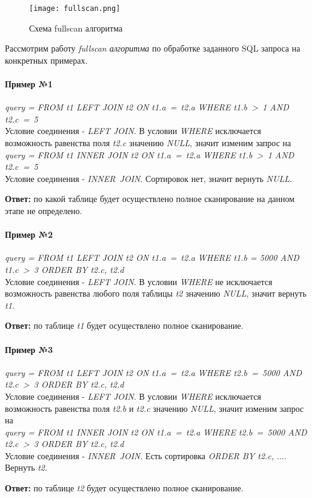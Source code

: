 \begin{figure}[h]
  \centering
  \texttt{[image: fullscan.png]}
  \caption{Схема fullscan алгоритма}
  \label{img:fullscan}
\end{figure}


Рассмотрим работу \textit{fullscan алгоритма} по обработке заданного SQL запроса на конкретных  примерах.

\paragraph{Пример №1}

\textit{query = FROM t1 LEFT JOIN t2 ON t1.a~=~t2.a WHERE t1.b~>~1 AND t2.c~=~5}\\
Условие соединения - \textit{LEFT JOIN}. В условии \textit{WHERE} исключается возможность равенства поля \textit{t2.c} значению \textit{NULL}, значит изменим запрос на\\
\textit{query = FROM t1 INNER JOIN t2 ON t1.a~=~t2.a WHERE t1.b~>~1 AND t2.c~=~5}\\
Условие соединения - \textit{INNER JOIN}. Сортировок нет, значит вернуть \textit{NULL}. 

\textbf{Ответ:} по какой таблице будет осуществлено полное сканирование на данном этапе не определено.


\paragraph{Пример №2}

\textit{query = FROM t1 LEFT JOIN t2  ON t1.a~=~t2.a WHERE t1.b = 5000 AND t1.c~>~3 ORDER BY t2.c, t2.d}\\
Условие соединения - \textit{LEFT JOIN}. В условии \textit{WHERE} не исключается возможность равенства любого поля таблицы \textit{t2} значению \textit{NULL}, значит вернуть \textit{t1}.

\textbf{Ответ:} по таблице \textit{t1} будет осуществлено полное сканирование. 


\paragraph{Пример №3}

\textit{query = FROM t1 LEFT JOIN t2 ON t1.a~=~t2.a WHERE t2.b~=~5000 AND t2.c~>~3 ORDER BY t2.c, t2.d}\\
Условие соединения - \textit{LEFT JOIN}. В условии \textit{WHERE} исключается возможность равенства поля \textit{t2.b} и \textit{t2.c} значению \textit{NULL}, значит изменим запрос на\\
\textit{query = FROM t1 INNER JOIN t2 ON t1.a~=~t2.a WHERE t2.b~=~5000 AND t2.c~>~3 ORDER BY t2.c, t2.d}\\
Условие соединения - \textit{INNER JOIN}. Есть сортировка \textit{ORDER BY t2.c, $\ldots$}. Вернуть \textit{t2}.

\textbf{Ответ:} по таблице \textit{t2} будет осуществлено полное сканирование. 